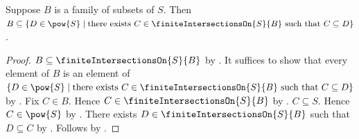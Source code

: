 \begin{proposition}\label{generators_in_finite_intersection_supersets}
    Suppose $B$ is a family of subsets of $S$.
    Then $B\subseteq
        \{D\in\pow{S}\mid
            \text{there exists $C\in\finiteIntersectionsOn{S}{B}$ such that
                $C\subseteq D$}\}$.
\end{proposition}
\begin{proof}
    $B\subseteq\finiteIntersectionsOn{S}{B}$ by
        .
    It suffices to show that every element of $B$ is an element of
        $\{D\in\pow{S}\mid
            \text{there exists $C\in\finiteIntersectionsOn{S}{B}$ such that
                $C\subseteq D$}\}$
        by .
    Fix $C\in B$.
    Hence $C\in\finiteIntersectionsOn{S}{B}$ by .
    $C\subseteq S$.
    Hence $C\in\pow{S}$ by .
    There exists $D\in\finiteIntersectionsOn{S}{B}$ such that
        $D\subseteq C$ by .
    Follows by \auto.
\end{proof}

